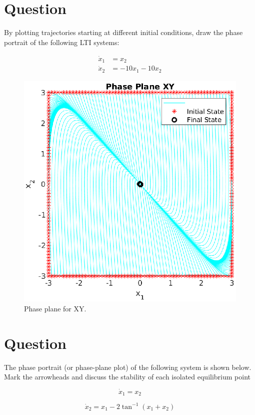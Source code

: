 \documentclass[a4paper,10pt]{article}
\begin{document}
\section{Question}
By plotting trajectories starting at different initial conditions, draw the phase portrait of the following LTI systems:

\begin{eqnarray}
\dot{x}_1 &= {x}_2 \\
\dot{x}_2 &= -10{x}_1-10{x}_2  
\end{eqnarray}

\begin{figure}[H]
  \centering
  \includegraphics[width=.8\linewidth]{question4.eps}
  \caption{Phase plane for XY.} \label{fig:q4}
\end{figure}

\section{Question}
The phase portrait (or phase-plane plot) of the following system is shown below.
Mark the arrowheads and discuss the stability of each isolated equilibrium point


\begin{equation}
\dot{x}_1 = {x}_2 
\end{equation}

\begin{equation}
\dot{x}_2 = {x}_1-2\tan^{-1}({x}_1+{x}_2) 
\end{equation}
\end{document}
